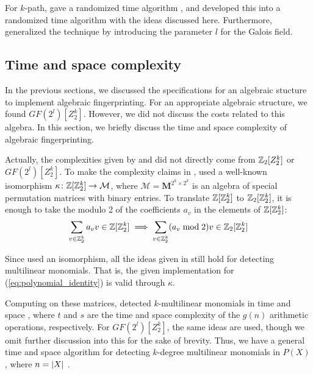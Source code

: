 For $k$-path, \citeauthor{Koutis08} 
gave a randomized  time algorithm \cite{Koutis08}, 
and \citeauthor{Williams09} developed this into a randomized  
time algorithm \cite{Williams09} with the ideas discussed here. 
Furthermore, \citeauthor{Williams09} 
generalized the technique by introducing the parameter $l$ for the Galois field.

\subsection{Time and space complexity}
\label{sect:complexity}

In the previous sections, we discussed the specifications 
for an algebraic stucture to implement algebraic fingerprinting. 
For an appropriate algebraic structure, we found $GF(2^{l})[Z_2^k]$. 
However, we did not discuss the costs related 
to this algebra. In this section, we briefly discuss the time and space complexity 
of algebraic fingerprinting.
%

Actually, the complexities given by \textcite{Koutis08} and 
\textcite{Williams09} did not directly come from 
$\mathbb Z_2[Z_2^k]$ or $GF(2^{l})[Z_2^k]$. 
To make the complexity claims in \cite{Koutis08}, 
\citeauthor{Koutis08} used a well-known \cite{Terras99} isomorphism 
$\kappa \colon \mathbb Z[\mathbb Z_2^k] \to \mathcal{M}$, where $\mathcal{M} = \mathbf{M}^{2^k \times 2^k}$ 
is an algebra of special permutation matrices with binary entries. To translate $\mathbb Z[\mathbb Z_2^k]$ to 
$\mathbb Z_2[\mathbb Z_2^k]$, it is enough to take the modulo 2 of the coefficients $a_v$ in 
the elements of $\mathbb Z[\mathbb Z_2^k]$: 
\[
  \sum_{v \in \mathbb Z_2^k}a_v v \in \mathbb Z[\mathbb Z_2^k] \implies 
  \sum_{v \in \mathbb Z_2^k}(a_v \bmod 2) v \in \mathbb Z_2[\mathbb Z_2^k]
\]

Since \citeauthor{Koutis08} 
used an isomorphism, all the ideas given in 
 still hold for 
detecting multilinear monomials. That is, 
the given implementation for (\ref{eq:polynomial_identity}) 
is valid through $\kappa$.

Computing on these matrices, 
\textcite{Koutis08} detected $k$-multilinear monomials 
in time  and space , where $t$ and $s$ are the time 
and space complexity of the $g(n)$ arithmetic operations, respectively. 
For $GF(2^{l})[Z_2^k]$, the same ideas are used, though we omit 
further discussion into this for the sake of brevity. 
Thus, we have a general 
 time and  space algorithm for detecting 
$k$-degree multilinear monomials in $P(X)$, where $n = {\left\vert X\right\vert}$ \cite{KouWil09}.

